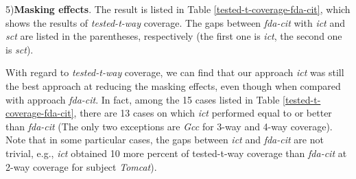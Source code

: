 \documentclass[journal,12pt,onecolumn,draftclsnofoot,]{IEEEtran}
\begin{document}
5)\textbf{Masking effects}.
The result is listed in Table \ref{tested-t-coverage-fda-cit}, which shows the results of \emph{tested-t-way} coverage. The gaps between \emph{fda-cit} with \emph{ict} and \emph{sct} are listed in the parentheses, respectively (the first one is \emph{ict}, the second one is \emph{sct}).

With regard to \emph{tested-t-way} coverage, we can find that our approach \emph{ict} was still the best approach at reducing the masking effects, even though when compared with approach \emph{fda-cit}. In fact, among the 15 cases listed in Table \ref{tested-t-coverage-fda-cit}, there are 13 cases on which \emph{ict} performed equal to or better than \emph{fda-cit} (The only two exceptions are \emph{Gcc} for 3-way and 4-way coverage). Note that in some particular cases, the gaps between \emph{ict} and \emph{fda-cit} are not trivial, e.g., \emph{ict} obtained 10 more percent of tested-t-way coverage than \emph{fda-cit} at 2-way coverage for subject \emph{Tomcat}).




\end{document}
